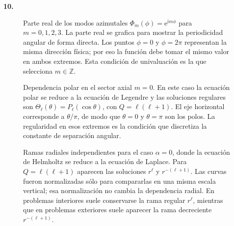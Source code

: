 \documentclass[11pt]{article}
\newcommand{\problema}[2]{%
\vspace{0.55em}
\noindent\textbf{#1.}\enspace{\small #2}\par
\vspace{0.3em}}
\newcommand{\ii}{\mathrm{i}}
\newcommand{\e}{\mathrm{e}}
\begin{document}
\problema{10}{Gráficos}

\begin{figure}[H]
    \centering
    
    \caption{Parte real de los modos azimutales $\Phi_m(\phi)=\e^{\ii m\phi}$ para $m=0,1,2,3$. La parte real se grafica para mostrar la periodicidad angular de forma directa. Los puntos $\phi=0$ y $\phi=2\pi$ representan la misma dirección física; por eso la función debe tomar el mismo valor en ambos extremos. Esta condición de univaluación es la que selecciona $m\in\mathbb{Z}$.}
    \label{fig:helmholtz-periodicidad}
\end{figure}

\begin{figure}[H]
    \centering
    
    \caption{Dependencia polar en el sector axial $m=0$. En este caso la ecuación polar se reduce a la ecuación de Legendre y las soluciones regulares son $\Theta_\ell(\theta)=P_\ell(\cos\theta)$, con $Q=\ell(\ell+1)$. El eje horizontal corresponde a $\theta/\pi$, de modo que $\theta=0$ y $\theta=\pi$ son los polos. La regularidad en esos extremos es la condición que discretiza la constante de separación angular.}
    \label{fig:helmholtz-legendre-axial}
\end{figure}

\begin{figure}[H]
    \centering
    
    \caption{Ramas radiales independientes para el caso $\alpha=0$, donde la ecuación de Helmholtz se reduce a la ecuación de Laplace. Para $Q=\ell(\ell+1)$ aparecen las soluciones $r^\ell$ y $r^{-(\ell+1)}$. Las curvas fueron normalizadas sólo para compararlas en una misma escala vertical; esa normalización no cambia la dependencia radial. En problemas interiores suele conservarse la rama regular $r^\ell$, mientras que en problemas exteriores suele aparecer la rama decreciente $r^{-(\ell+1)}$.}
    \label{fig:helmholtz-radial-laplace}
\end{figure}
\end{document}
